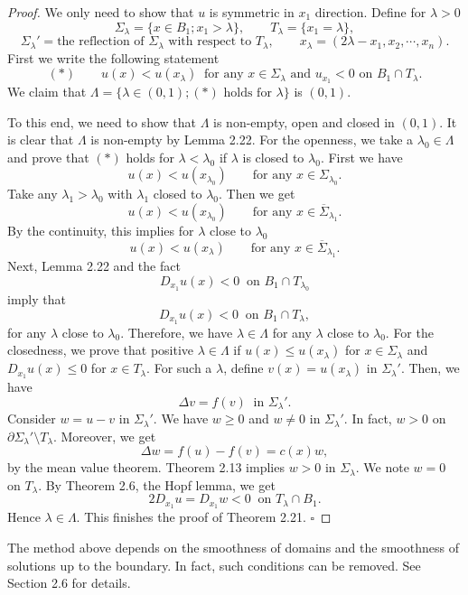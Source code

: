 \begin{proof}
\sketch
We only need to show that $u$ is symmetric in $x_1$ direction. Define for $\lambda>0$
\[
\Sigma_\lambda=\{x\in B_1;x_1>\lambda\},
\qquad
T_\lambda=\{x_1=\lambda\},
\]
\[
\Sigma_\lambda'=\text{the reflection of }\Sigma_\lambda\text{ with respect to }T_\lambda,
\qquad
x_\lambda=(2\lambda-x_1,x_2,\cdots,x_n).
\]
First we write the following statement
\[
(*)
\qquad
u(x)<u(x_\lambda)\ \text{ for any }x\in\Sigma_\lambda\text{ and }u_{x_1}<0\text{ on }B_1\cap T_\lambda.
\]
We claim that $\Lambda=\{\lambda\in(0,1);(*)\text{ holds for }\lambda\}$ is $(0,1)$.

To this end, we need to show that $\Lambda$ is non-empty, open and closed in $(0,1)$. It is clear that $\Lambda$ is non-empty by Lemma 2.22. For the openness, we take a $\lambda_0\in\Lambda$ and prove that $(*)$ holds for $\lambda<\lambda_0$ if $\lambda$ is closed to $\lambda_0$. First we have
\[
u(x)<u(x_{\lambda_0})\qquad \text{for any }x\in\Sigma_{\lambda_0}.
\]
Take any $\lambda_1>\lambda_0$ with $\lambda_1$ closed to $\lambda_0$. Then we get
\[
u(x)<u(x_{\lambda_0})\qquad \text{for any }x\in\overline{\Sigma}_{\lambda_1}.
\]
By the continuity, this implies for $\lambda$ close to $\lambda_0$
\[
u(x)<u(x_\lambda)\qquad \text{for any }x\in\overline{\Sigma}_{\lambda_1}.
\]
Next, Lemma 2.22 and the fact
\[
D_{x_1}u(x)<0\ \text{ on }B_1\cap T_{\lambda_0}
\]
imply that
\[
D_{x_1}u(x)<0\ \text{ on }B_1\cap T_\lambda,
\]
for any $\lambda$ close to $\lambda_0$. Therefore, we have $\lambda\in\Lambda$ for any $\lambda$ close to $\lambda_0$. For the closedness, we prove that positive $\lambda\in\Lambda$ if $u(x)\leq u(x_\lambda)$ for $x\in\Sigma_\lambda$ and $D_{x_1}u(x)\leq 0$ for $x\in T_\lambda$. For such a $\lambda$, define $v(x)=u(x_\lambda)$ in $\Sigma_\lambda'$. Then, we have
\[
\Delta v=f(v)\ \text{ in }\Sigma_\lambda'.
\]
Consider $w=u-v$ in $\Sigma_\lambda'$. We have $w\geq 0$ and $w\neq 0$ in $\Sigma_\lambda'$. In fact, $w>0$ on $\partial\Sigma_\lambda'\setminus T_\lambda$. Moreover, we get
\[
\Delta w=f(u)-f(v)=c(x)w,
\]
by the mean value theorem. Theorem 2.13 implies $w>0$ in $\Sigma_\lambda$. We note $w=0$ on $T_\lambda$. By Theorem 2.6, the Hopf lemma, we get
\[
2D_{x_1}u=D_{x_1}w<0\ \text{ on }T_\lambda\cap B_1.
\]
Hence $\lambda\in\Lambda$. This finishes the proof of Theorem 2.21. \(\square\)
\end{proof}

\begin{remark}\label{hanlin:maxprin-remark-2-23}
The method above depends on the smoothness of domains and the smoothness of solutions up to the boundary. In fact, such conditions can be removed. See Section 2.6 for details.
\end{remark}

